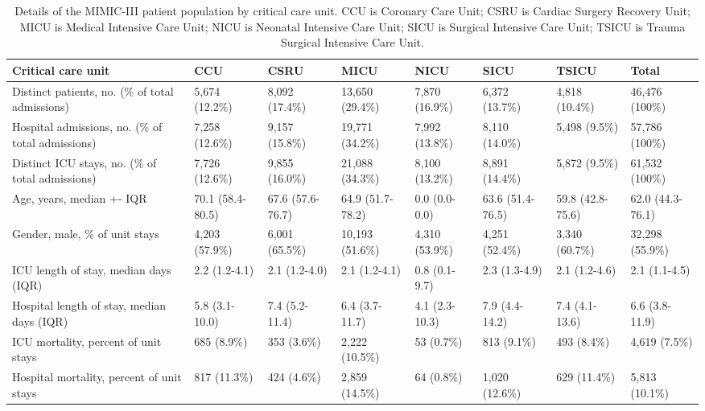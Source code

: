 \documentclass[english]{article}
\begin{document}
\begin{center}
\begin{table}
\begin{tabular}{|p{1.8cm}|p{1.2cm}|p{1.2cm}|p{1.2cm}|p{1.2cm}|p{1.2cm}|p{1.2cm}|p{1.2cm}|}
    \hline
    Critical care unit & CCU & CSRU & MICU & NICU & SICU & TSICU & Total \\ 
    \hline
    Distinct patients, no. (\% of total admissions) & 5,674 (12.2\%) & 8,092 (17.4\%) & 13,650 (29.4\%) & 7,870 (16.9\%) & 6,372 (13.7\%) & 4,818 (10.4\%) & 46,476 (100\%) \\ 
    \hline
    Hospital admissions, no. (\% of total admissions) & 7,258 (12.6\%) & 9,157 (15.8\%) & 19,771 (34.2\%) & 7,992 (13.8\%) & 8,110 (14.0\%) & 5,498 (9.5\%) & 57,786 (100\%) \\ 
    \hline
    Distinct ICU stays, no. (\% of total admissions) & 7,726 (12.6\%) & 9,855 (16.0\%) & 21,088 (34.3\%) & 8,100 (13.2\%) & 8,891 (14.4\%) & 5,872 (9.5\%) & 61,532 (100\%) \\ 
    \hline
    Age, years, median +- IQR & 70.1 (58.4-80.5) & 67.6 (57.6-76.7) & 64.9 (51.7-78.2) & 0.0 (0.0-0.0) & 63.6 (51.4-76.5) & 59.8 (42.8-75.6) & 62.0 (44.3-76.1) \\ 
    \hline
    Gender, male, \% of unit stays & 4,203 (57.9\%) & 6,001 (65.5\%) & 10,193 (51.6\%) & 4,310 (53.9\%) & 4,251 (52.4\%) & 3,340 (60.7\%) & 32,298 (55.9\%) \\ 
    \hline
    ICU length of stay, median days (IQR) & 2.2 (1.2-4.1) & 2.1 (1.2-4.0) &  2.1 (1.2-4.1) & 0.8 (0.1-9.7) & 2.3 (1.3-4.9) & 2.1 (1.2-4.6) & 2.1 (1.1-4.5) \\ 
    \hline
    Hospital length of stay, median days (IQR) & 5.8 (3.1-10.0) & 7.4 (5.2-11.4) & 6.4 (3.7-11.7) & 4.1 (2.3-10.3) & 7.9 (4.4-14.2) & 7.4 (4.1-13.6) & 6.6 (3.8-11.9) \\
    \hline
    ICU mortality, percent of unit stays & 685 (8.9\%) & 353 (3.6\%) & 2,222 (10.5\%) & 53 (0.7\%) & 813 (9.1\%) & 493 (8.4\%) & 4,619 (7.5\%) \\ 
    \hline
    Hospital mortality, percent of unit stays & 817 (11.3\%) & 424 (4.6\%) & 2,859 (14.5\%) & 64 (0.8\%) &  1,020 (12.6\%) & 629 (11.4\%) & 5,813 (10.1\%) \\ 
    \hline
\end{tabular}
\caption{Details of the MIMIC-III patient population by critical care unit. CCU is Coronary Care Unit; CSRU is Cardiac Surgery Recovery Unit; MICU is Medical Intensive Care Unit; NICU is Neonatal Intensive Care Unit; SICU is Surgical Intensive Care Unit; TSICU is Trauma Surgical Intensive Care Unit.}
\label{table:patientpopulation}
\end{table}
\end{center}
\end{document}

